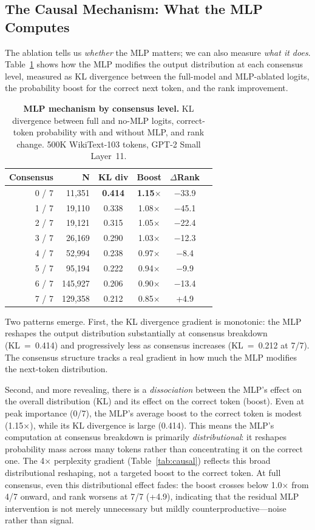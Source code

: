 \documentclass{article}
\begin{document}
\subsection{The Causal Mechanism: What the MLP Computes}
\label{sec:mechanism}

The ablation tells us \emph{whether} the MLP matters; we can also measure \emph{what it does}.
Table~\ref{tab:mechanism} shows how the MLP modifies the output distribution at each consensus
level, measured as KL divergence between the full-model and MLP-ablated logits, the probability
boost for the correct next token, and the rank improvement.

\begin{table}[H]
\caption{\textbf{MLP mechanism by consensus level.} KL divergence between full and no-MLP logits,
  correct-token probability with and without MLP, and rank change. 500K WikiText-103 tokens, GPT-2 Small Layer~11.}
\label{tab:mechanism}
\centering
\begin{tabular}{rrcccc}
\toprule
Consensus & N & KL div & Boost & $\Delta$Rank \\
\midrule
0 / 7 & 11,351  & \textbf{0.414} & \textbf{1.15$\times$} & $-$33.9 \\
1 / 7 & 19,110  & 0.338 & 1.08$\times$ & $-$45.1 \\
2 / 7 & 19,121  & 0.315 & 1.05$\times$ & $-$22.4 \\
3 / 7 & 26,169  & 0.290 & 1.03$\times$ & $-$12.3 \\
4 / 7 & 52,994  & 0.238 & 0.97$\times$ & $-$8.4 \\
5 / 7 & 95,194  & 0.222 & 0.94$\times$ & $-$9.9 \\
6 / 7 & 145,927 & 0.206 & 0.90$\times$ & $-$13.4 \\
7 / 7 & 129,358 & 0.212 & 0.85$\times$ & +4.9 \\
\bottomrule
\end{tabular}
\end{table}

Two patterns emerge. First, the KL divergence gradient is monotonic: the MLP reshapes the
output distribution substantially at consensus breakdown (KL~=~0.414) and progressively less
as consensus increases (KL~=~0.212 at 7/7). The consensus structure tracks a real gradient
in how much the MLP modifies the next-token distribution.

Second, and more revealing, there is a \emph{dissociation} between the MLP's effect on the
overall distribution (KL) and its effect on the correct token (boost). Even at peak
importance (0/7), the MLP's average boost to the correct token is modest (1.15$\times$),
while its KL divergence is large (0.414). This means the MLP's computation at consensus
breakdown is primarily \emph{distributional}: it reshapes probability mass across many tokens
rather than concentrating it on the correct one. The 4$\times$ perplexity gradient
(Table~\ref{tab:causal}) reflects this broad distributional reshaping, not a targeted boost to
the correct token. At full consensus, even this distributional effect fades: the boost crosses
below 1.0$\times$ from 4/7 onward, and rank worsens at 7/7 (+4.9), indicating that the
residual MLP intervention is not merely unnecessary but mildly counterproductive---noise
rather than signal.
\end{document}
